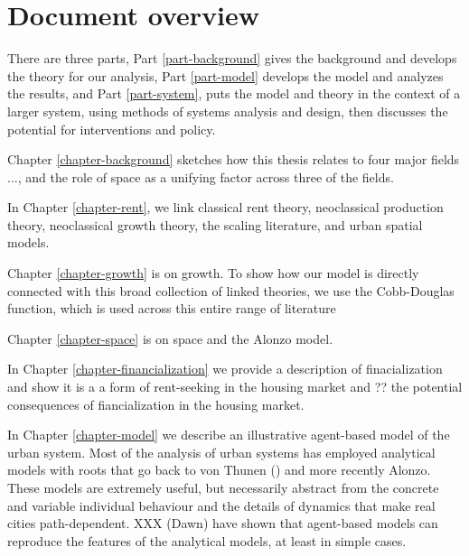 \section{Document overview}

There are three parts, Part \ref{part-background} gives the background and develops the theory for our analysis, Part \ref{part-model} develops the model and analyzes the results, and Part \ref{part-system}, puts the model and theory in the context of a larger system, using methods of systems analysis and design, then discusses the potential for interventions and policy.

Chapter \ref{chapter-background} sketches how this thesis relates to four major fields ..., and the role of space as a unifying factor across three of the fields.

In Chapter \ref{chapter-rent}, we link classical rent theory, neoclassical production theory, neoclassical growth theory, the scaling literature, and urban spatial models.

Chapter \ref{chapter-growth} is on growth. To show how our model is directly connected with this broad collection of linked theories, we use the Cobb-Douglas function, which is used across this entire range of literature 



Chapter \ref{chapter-space} is on space and the Alonzo model.

In Chapter \ref{chapter-financialization} we  provide a description of finacialization and show it is a a form of rent-seeking in the housing market and ?? the potential consequences of fiancialization in the housing market. 

In Chapter \ref{chapter-model} we  describe an illustrative agent-based model of the urban system. Most of the analysis of urban systems has employed analytical models with roots that go back to von Thunen () and more recently Alonzo. These models are extremely useful, but necessarily abstract from the concrete  and variable individual behaviour and  the details  of dynamics that make real cities path-dependent. XXX (Dawn) have shown that agent-based models can reproduce the features of the analytical models, at least in simple cases. 


